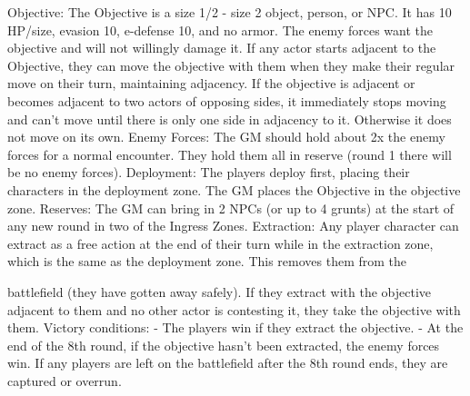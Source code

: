                                                                      Objective: The Objective is a size 1/2 - size  
                                                                     2 object, person, or NPC. It has 10 HP/size,  
                                                                     evasion 10, e-defense 10, and no armor.  
                                                                     The enemy forces want the objective and  
                                                                     will not willingly damage it. If any actor starts  
                                                                     adjacent to the Objective, they can move the  
                                                                     objective with them when they make their  
                                                                     regular move on their turn, maintaining  
                                                                     adjacency. If the objective is adjacent or  
                                                                     becomes adjacent to two actors of opposing  
                                                                     sides, it immediately stops moving and can’t  
                                                                     move until there is only one side in  
                                                                     adjacency to it. Otherwise it does not move  
                                                                    on its own.  
Enemy Forces: The GM should hold about 2x the enemy forces for a normal encounter. They  
hold them all in reserve (round 1 there will be no enemy forces).  
Deployment: The players deploy first, placing their characters in the deployment zone. The GM  
places the Objective in the objective zone.  
Reserves: The GM can bring in 2 NPCs (or up to 4 grunts) at the start of any new round in two of  
the Ingress Zones.  
Extraction: Any player character can extract as a free action at the end of their turn while in the  
extraction zone, which is the same as the deployment zone. This removes them from the  

                                                                                                                           


battlefield (they have gotten away safely). If they extract with the objective adjacent to them and  
no other actor is contesting it, they take the objective with them.  
Victory conditions:   
         - The players win if they extract the objective.  
         - At the end of the 8th round, if the objective hasn’t been extracted, the enemy forces win.   
         If any players are left on the battlefield after the 8th round ends, they are captured or  
        overrun.  

